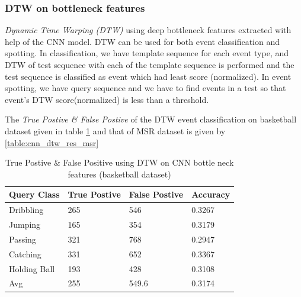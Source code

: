 \subsubsection{DTW on bottleneck features}
\textit{Dynamic Time Warping (DTW)} using deep bottleneck features extracted with help of the CNN model. DTW can be used for both event classification and spotting. In classification, we have template sequence for each event type, and DTW of test sequence with each of the template sequence is performed and the test sequence is classified as event which had least score (normalized). In event spotting, we have query sequence and we have to find events in a test so that event's DTW score(normalized) is less than a threshold.


The \textit{True Postive \& False Postive} of the DTW event classification on basketball dataset given in table \ref{table:cnn_dtw_res_basket} and that of MSR dataset is given by \ref{table:cnn_dtw_res_msr}

\begin{table}[h]
\centering
\begin{tabular}{|l|l|l|l|}
\hline
Query Class & True Postive & False Postive & Accuracy \\ \hline
Dribbling   &265  &546   &0.3267\\
Jumping     &165  &354   &0.3179\\
Passing     &321  &768   &0.2947\\
Catching    &331  &652   &0.3367\\
Holding Ball &193  &428   &0.3108\\
\hline
Avg         &255  &549.6 &0.3174\\
\hline  
\end{tabular}
\caption[Event classification using DTW on CNN bottleneck features (OSUPEL basketball dataset) ]{True Postive \& False Positive using DTW on CNN bottle neck features (basketball dataset)}
\label{table:cnn_dtw_res_basket}
\end{table} 

